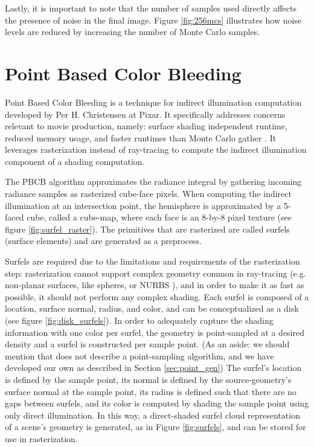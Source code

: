 Lastly, it is important to note that the number of samples used directly affects the presence of noise in the final image. Figure \ref{fig:256mcs} illustrates how noise levels are reduced by increasing the number of Monte Carlo samples.

\section{Point Based Color Bleeding}

Point Based Color Bleeding is a technique for indirect illumination computation developed by Per H. Christensen at Pixar. It specifically addresses concerns relevant to movie production, namely: surface shading independent runtime, reduced memory usage, and faster runtimes than Monte Carlo gather \cite{bib:christensen2008}. It leverages rasterization instead of ray-tracing to compute the indirect illumination component of a shading computation.

The PBCB algorithm approximates the radiance integral by gathering incoming radiance samples as rasterized cube-face pixels. When computing the indirect illumination at an intersection point, the hemisphere is approximated by a 5-faced cube, called a cube-map, where each face is an 8-by-8 pixel texture (see figure \ref{fig:surfel_raster}). The primitives that are rasterized are called surfels (surface elements) and are generated as a preprocess.

Surfels are required due to the limitations and requirements of the rasterization step: rasterization cannot support complex geometry common in ray-tracing (e.g. non-planar surfaces, like spheres, or NURBS \cite{bib:nurbs}), and in order to make it as fast as possible, it should not perform any complex shading. Each surfel is composed of a location, surface normal, radius, and color, and can be conceptualized as a disk (see figure \ref{fig:disk_surfels}). In order to adequately capture the shading information with one color per surfel, the geometry is point-sampled at a desired density and a surfel is constructed per sample point. (As an aside: we should mention that \cite{bib:christensen2008} does not describe a point-sampling algorithm, and we have developed our own as described in Section \ref{sec:point_gen}) The surfel’s location is defined by the sample point, its normal is defined by the source-geometry’s surface normal at the sample point, its radius is defined such that there are no gaps between surfels, and its color is computed by shading the sample point using only direct illumination. In this way, a direct-shaded surfel cloud representation of a scene’s geometry is generated, as in Figure \ref{fig:surfels}, and can be stored for use in rasterization.

